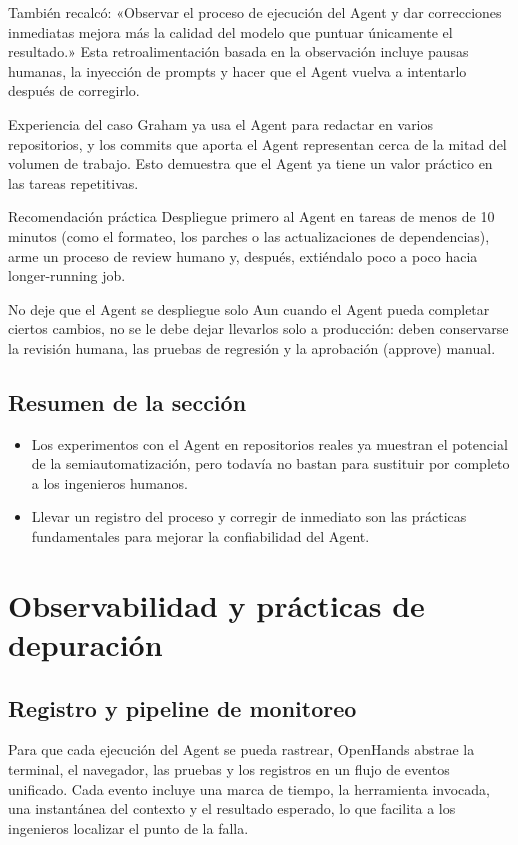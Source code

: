 \documentclass[a4paper]{article}
\begin{document}
También recalcó: «Observar el proceso de ejecución del Agent y dar correcciones inmediatas mejora más la calidad del modelo que puntuar únicamente el resultado.» Esta retroalimentación basada en la observación incluye pausas humanas, la inyección de prompts y hacer que el Agent vuelva a intentarlo después de corregirlo.

\begin{knowledgebox}{Experiencia del caso}
Graham ya usa el Agent para redactar en varios repositorios, y los commits que aporta el Agent representan cerca de la mitad del volumen de trabajo. Esto demuestra que el Agent ya tiene un valor práctico en las tareas repetitivas.
\end{knowledgebox}

\begin{importantbox}{Recomendación práctica}
Despliegue primero al Agent en tareas de menos de 10 minutos (como el formateo, los parches o las actualizaciones de dependencias), arme un proceso de review humano y, después, extiéndalo poco a poco hacia longer-running job.
\end{importantbox}

\begin{warningbox}{No deje que el Agent se despliegue solo}
Aun cuando el Agent pueda completar ciertos cambios, no se le debe dejar llevarlos solo a producción: deben conservarse la revisión humana, las pruebas de regresión y la aprobación (approve) manual.
\end{warningbox}

\subsection{Resumen de la sección}
\begin{itemize}
    \item Los experimentos con el Agent en repositorios reales ya muestran el potencial de la semiautomatización, pero todavía no bastan para sustituir por completo a los ingenieros humanos.
    \item Llevar un registro del proceso y corregir de inmediato son las prácticas fundamentales para mejorar la confiabilidad del Agent.
\end{itemize}
\section{Observabilidad y prácticas de depuración}
\subsection{Registro y pipeline de monitoreo}
Para que cada ejecución del Agent se pueda rastrear, OpenHands abstrae la terminal, el navegador, las pruebas y los registros en un flujo de eventos unificado. Cada evento incluye una marca de tiempo, la herramienta invocada, una instantánea del contexto y el resultado esperado, lo que facilita a los ingenieros localizar el punto de la falla.
\end{document}
